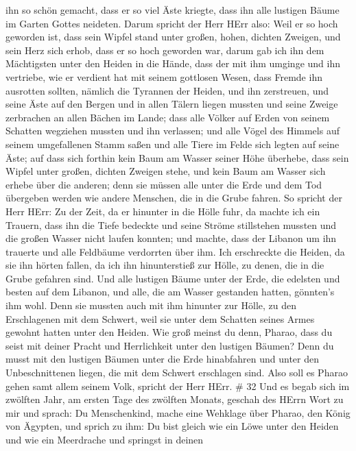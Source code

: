 ihn so schön gemacht, dass er so viel Äste kriegte, dass ihn alle
lustigen Bäume im Garten Gottes neideten.  Darum spricht
der Herr HErr also: Weil er so hoch geworden ist, dass sein Wipfel stand
unter großen, hohen, dichten Zweigen, und sein Herz sich erhob, dass er
so hoch geworden war,  darum gab ich ihn dem Mächtigsten
unter den Heiden in die Hände, dass der mit ihm umginge und ihn
vertriebe, wie er verdient hat mit seinem gottlosen Wesen, 
dass Fremde ihn ausrotten sollten, nämlich die Tyrannen der Heiden, und
ihn zerstreuen, und seine Äste auf den Bergen und in allen Tälern liegen
mussten und seine Zweige zerbrachen an allen Bächen im Lande; dass alle
Völker auf Erden von seinem Schatten wegziehen mussten und ihn
verlassen;  und alle Vögel des Himmels auf seinem
umgefallenen Stamm saßen und alle Tiere im Felde sich legten auf seine
Äste;  auf dass sich forthin kein Baum am Wasser seiner
Höhe überhebe, dass sein Wipfel unter großen, dichten Zweigen stehe, und
kein Baum am Wasser sich erhebe über die anderen; denn sie müssen alle
unter die Erde und dem Tod übergeben werden wie andere Menschen, die in
die Grube fahren.  So spricht der Herr HErr: Zu der Zeit,
da er hinunter in die Hölle fuhr, da machte ich ein Trauern, dass ihn
die Tiefe bedeckte und seine Ströme stillstehen mussten und die großen
Wasser nicht laufen konnten; und machte, dass der Libanon um ihn
trauerte und alle Feldbäume verdorrten über ihm.  Ich
erschreckte die Heiden, da sie ihn hörten fallen, da ich ihn
hinunterstieß zur Hölle, zu denen, die in die Grube gefahren sind. Und
alle lustigen Bäume unter der Erde, die edelsten und besten auf dem
Libanon, und alle, die am Wasser gestanden hatten, gönnten's ihm wohl.
 Denn sie mussten auch mit ihm hinunter zur Hölle, zu den
Erschlagenen mit dem Schwert, weil sie unter dem Schatten seines Armes
gewohnt hatten unter den Heiden.  Wie groß meinst du denn,
Pharao, dass du seist mit deiner Pracht und Herrlichkeit unter den
lustigen Bäumen? Denn du musst mit den lustigen Bäumen unter die Erde
hinabfahren und unter den Unbeschnittenen liegen, die mit dem Schwert
erschlagen sind. Also soll es Pharao gehen samt allem seinem Volk,
spricht der Herr HErr. \# 32  Und es begab sich im zwölften
Jahr, am ersten Tage des zwölften Monats, geschah des HErrn Wort zu mir
und sprach:  Du Menschenkind, mache eine Wehklage über
Pharao, den König von Ägypten, und sprich zu ihm: Du bist gleich wie ein
Löwe unter den Heiden und wie ein Meerdrache und springst in deinen
